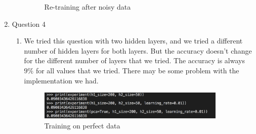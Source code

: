 \documentclass[11pt]{article}
\begin{document}
\begin{enumerate}
\begin{enumerate}
\begin{figure}[h!]
\begin{minipage}{0.45\textwidth}
         \caption{Re-training after noisy data}
    \end{minipage}\hfill
\end{figure}

\end{enumerate}

\newpage
\item Question 4
\begin{enumerate}
\item We tried this question with two hidden layers, and we tried a different number of hidden layers for both layers. But the accuracy doesn't change for the different number of layers that we tried. The accuracy is always $9\%$ for all values that we tried. There may be some problem with the implementation we had.
\begin{figure}[h!]
    	\centering
        \includegraphics[width=0.9\textwidth]{q4}
        \caption{Training on perfect data}
\end{figure}


\end{enumerate}

\end{enumerate}
\end{document}
